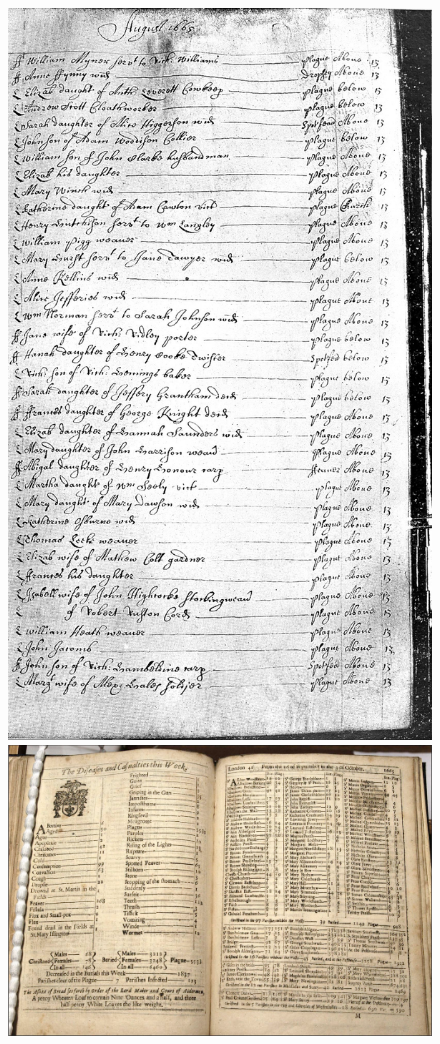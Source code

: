 \begin{figure}
\begin{center}
{\includegraphics[height=\pixht]{images/cripplegate_wellcome_parish.jpg}
\hspace{0.4cm}
\includegraphics[height=\pixht]{images/bill1665adjust.pdf}
}
\end{center}
\end{figure}
